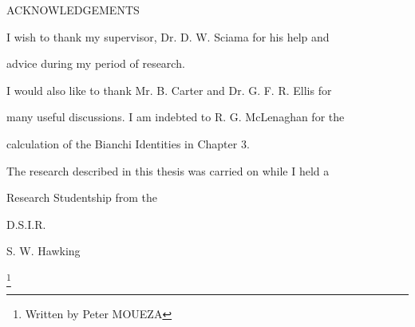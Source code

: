 \documentclass{article}
\begin{document}







ACKNOWLEDGEMENTS

I wish to thank my supervisor, Dr. D. W. Sciama for his help and

advice during my period of research.

I would also like to thank Mr. B. Carter and Dr. G. F. R. Ellis for

many useful discussions. I am indebted to R. G. McLenaghan for the

calculation of the Bianchi Identities in Chapter 3.

The research described in this thesis was carried on while I held a

Research Studentship from the

D.S.I.R.

S. W. Hawking

\footnote{Written by Peter MOUEZA}
\end{document}
